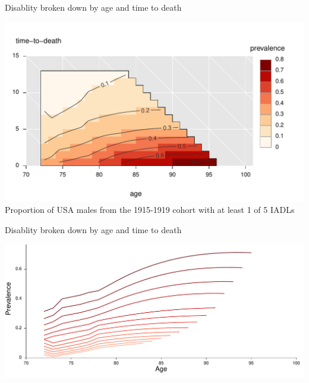 \documentclass[20pt]{beamer}
\begin{document}
\begin{frame}{Disablity broken down by age and time to death}{}
\begin{center}
\includegraphics[scale=1.2]{Figures/IADL1_Males.pdf}
\\
\small Proportion of USA
males from the 1915-1919 cohort with at least 1 of 5 IADLs
\end{center}
\end{frame}

\begin{frame}{Disablity broken down by age and time to death}{}
\begin{center}
\includegraphics[scale=.8]{Figures/IADLagelines.pdf}
\end{center}
\end{frame}
\end{document}
